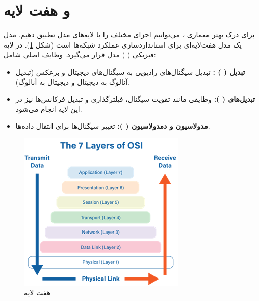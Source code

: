 \documentclass[landscape, 12pt]{report}
\begin{document}
\section*{
و
هفت لایه
}
برای درک بهتر معماری
 ، می‌توانیم اجزای مختلف
   را با لایه‌های مدل
    تطبیق دهیم. مدل
      یک مدل هفت‌لایه‌ای برای استانداردسازی عملکرد شبکه‌ها است (شکل \ref{fig:OSI7Layer}).
      در لایه فیزیکی (
      ) مدل
        قرار می‌گیرد. وظایف اصلی
         شامل:
\begin{itemize}
\item
\textbf{ تبدیل
  (
  )
  :}
تبدیل سیگنال‌های رادیویی به سیگنال‌های دیجیتال و برعکس (تبدیل آنالوگ به دیجیتال و دیجیتال به آنالوگ).
\item 
\textbf{تبدیل‌های
  (
  ): }
وظایفی مانند تقویت سیگنال، فیلترگذاری و تبدیل فرکانس‌ها نیز در این لایه انجام می‌شود.
\item 
\textbf{مدولاسیون و دمدولاسیون
  (
  ):}
تغییر سیگنال‌ها برای انتقال داده‌ها. 
\end{itemize}
     \begin{figure}[ht]
     	\centering
     	\includegraphics[height=.3\linewidth]{Pic/OSI7Layer}
     	\caption{هفت لایه
     	}
     	\label{fig:OSI7Layer}
     \end{figure}
     
\end{document}
